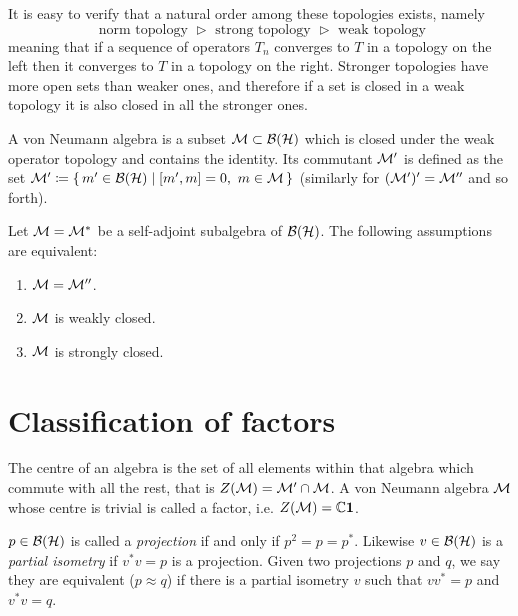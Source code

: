 It is easy to verify that a natural order among these 
topologies exists, namely
\[
\text{ norm topology }\vartriangleright
\text{ strong topology }\vartriangleright
\text{ weak topology}
\]
meaning that if a sequence of operators $T_n$ converges
to $T$ in a topology on the left then it converges
to $T$ in a topology on the right. Stronger topologies
have more open sets than weaker ones, and therefore 
if a set is closed in a weak topology it is also closed
in all the stronger ones.

 \begin{definition}
 A von Neumann algebra is a subset $\mathcal{M}\subset\mathcal{B}(\mathcal{H})$ which is 
 closed under the weak operator topology and contains the
 identity. Its commutant ${\mathcal{M}}'$ is defined as the set 
 ${\vN}'\coloneqq \set{m'\in\bh\mid \comm{m',m}=0,\ m\in\vN}$
 (similarly for $({\mathcal{M}}')'={\mathcal{M}}''$ and so forth).
 \end{definition}
 
 \begin{property}
 Let $\mathcal{M}={\mathcal{M}}^*$ be a self-adjoint subalgebra of $\mathcal{B}(\mathcal{H})$. 
 The following assumptions are equivalent:
  \begin{enumerate}
  \item $\mathcal{M}={\mathcal{M}}''$.
  \item $\mathcal{M}$ is weakly closed.
  \item $\mathcal{M}$ is strongly closed.
  \end{enumerate}
 \end{property}

\section{Classification of factors}
\label{Classification of factors}
 \begin{definition}[Factor]
 The centre of an algebra is the set of all elements
 within that algebra which commute with all the rest,
 that is $Z(\mathcal{M})=\mathcal{M}'\cap\mathcal{M}$.  
 A von Neumann algebra $\mathcal{M}$ whose centre is trivial 
 is called a factor, i.e. $Z(\mathcal{M})=\mathbb{C}\bm{1}$.
 \end{definition}
 
 \begin{definition}[Projections]
 $p\in\mathcal{B}(\mathcal{H})$ is called a \emph{projection} if and only if
 $p^2=p=p^*$. Likewise $v\in\mathcal{B}(\mathcal{H})$ is a \emph{partial isometry}
 if $v^* v=p$ is a projection. Given two projections
 $p$ and $q$, we say they are equivalent ($p\approx q$) 
 if there is a partial  isometry $v$ such that $vv^*=p$
 and $v^* v=q$.
 \end{definition}
 
